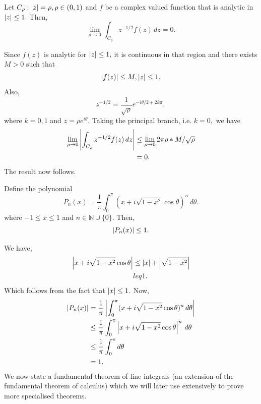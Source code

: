 \documentclass[12pt]{book}
\begin{document}
\begin{exmp}
    Let $C_{\rho}: \left\lvert z \right\rvert = \rho, \rho \in (0, 1)$ and $f$ be a complex valued function that is analytic in $\left\lvert z \right\rvert \leq 1.$ Then,
    \[
        \lim_{\rho \rightarrow 0} \int_{C_{\rho}} z^{-1/2}f(z)\,dz = 0.
    \]
\end{exmp}
Since $f(z)$ is analytic for $\left\lvert z \right\rvert \leq 1,$ it is continuous in that region and there exists $M > 0$ such that 
\[
    \left\lvert f(z) \right\rvert \leq M, \left\lvert z \right\rvert \leq 1.
\]
Also,
\[
    z^{-1/2} = \frac{1}{\sqrt{\rho}}e^{-i \theta / 2 + 2k\pi},
\]
where $k = 0, 1$ and $z = \rho e^{i\theta}.$ Taking the principal branch, i.e. $k = 0,$ we have
\begin{align*}
    \lim_{\rho \rightarrow 0} \left\lvert \int_{C_{\rho}} z^{-1/2}f(z)\,dz \right\rvert 
        &\leq
            \lim_{\rho \rightarrow 0} 2\pi \rho * M / \sqrt{\rho} \\
        &=
            0.
\end{align*}
The result now follows.

\begin{exmp}
    Define the polynomial 
    \[
        P_{n}(x) = \frac{1}{\pi}\int_{0}^{\pi}(x + i \sqrt{1 - x^2}\cos\theta)^{n}\,d\theta.
    \]
    where $-1 \leq x \leq 1$ and $n \in \mathbb{N}\cup\{0\}.$ Then,
    \[
        \left\lvert P_{n}(x) \right\rvert \leq 1.
    \]
\end{exmp}
We have,
\begin{align*}
    \left\lvert x + i\sqrt{1 - x^2}\cos\theta \right\rvert
        &\leq
            \left\lvert x \right\rvert + \left\lvert \sqrt{1 - x^2} \right\rvert \\
        &leq
            1.
\end{align*}
Which follows from the fact that $\left\lvert x \right\rvert \leq 1.$ Now,
\begin{align*}
    \left\lvert P_{n}(x) \right\rvert
        &=
            \frac{1}{\pi}\left\lvert \int_{0}^{\pi}(x + i \sqrt{1 - x^2}\cos\theta)^{n}\,d\theta \right\rvert \\
        &\leq
            \frac{1}{\pi}\int_{0}^{\pi}\left\lvert x + i \sqrt{1 - x^2}\cos\theta \right\rvert^{n}\,d\theta \\
        &\leq
            \frac{1}{\pi} \int_{0}^{\pi}d\theta\\
        &=
            1.
\end{align*}
We now state a fundamental theorem of line integrals (an extension of the fundamental theorem of calculus) which we will later use extensively to prove more specialised theorems.
\end{document}
